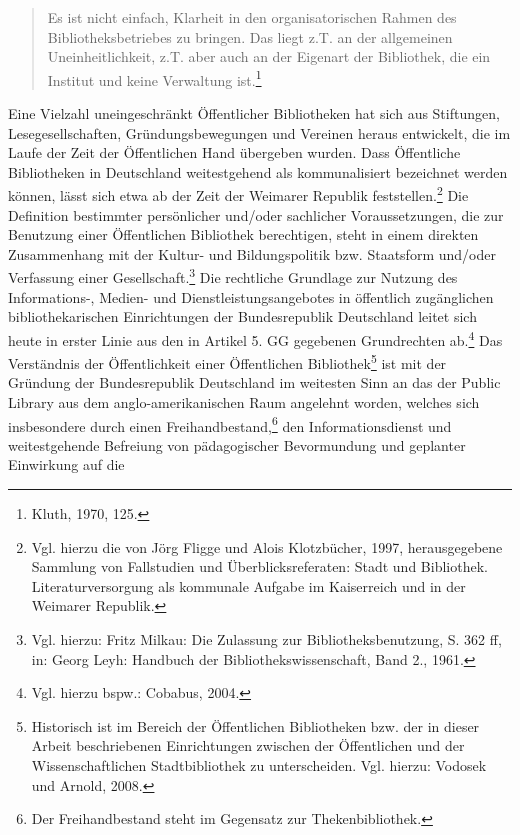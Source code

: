 \documentclass[a4paper,
fontsize=11pt,
oneside,
numbers=noperiodatend,
parskip=half-,
bibliography=totoc,
final
]{scrartcl}
\begin{document}
\begin{quote}
Es ist nicht einfach, Klarheit in den organisatorischen Rahmen des
Bibliotheksbetriebes zu bringen. Das liegt z.T. an der allgemeinen
Uneinheitlichkeit, z.T. aber auch an der Eigenart der Bibliothek, die
ein Institut und keine Verwaltung ist.\footnote{Kluth, 1970, 125.}
\end{quote}

Eine Vielzahl uneingeschränkt Öffentlicher Bibliotheken hat sich aus
Stiftungen, Lesegesellschaften, Gründungsbewegungen und Vereinen heraus
entwickelt, die im Laufe der Zeit der Öffentlichen Hand übergeben
wurden. Dass Öffentliche Bibliotheken in Deutschland weitestgehend als
kommunalisiert bezeichnet werden können, lässt sich etwa ab der Zeit der
Weimarer Republik feststellen.\footnote{Vgl. hierzu die von Jörg Fligge
  und Alois Klotzbücher, 1997, herausgegebene Sammlung von Fallstudien
  und Überblicksreferaten: Stadt und Bibliothek. Literaturversorgung als
  kommunale Aufgabe im Kaiserreich und in der Weimarer Republik.} Die
Definition bestimmter persönlicher und/oder sachlicher Voraussetzungen,
die zur Benutzung einer Öffentlichen Bibliothek berechtigen, steht in
einem direkten Zusammenhang mit der Kultur- und Bildungspolitik bzw.
Staatsform und/oder Verfassung einer Gesellschaft.\footnote{Vgl. hierzu:
  Fritz Milkau: Die Zulassung zur Bibliotheksbenutzung, S. 362 ff, in:
  Georg Leyh: Handbuch der Bibliothekswissenschaft, Band 2., 1961.} Die
rechtliche Grundlage zur Nutzung des Informations-, Medien- und
Dienstleistungsangebotes in öffentlich zugänglichen bibliothekarischen
Einrichtungen der Bundesrepublik Deutschland leitet sich heute in erster
Linie aus den in Artikel 5. GG gegebenen Grundrechten ab.\footnote{Vgl.
  hierzu bspw.: Cobabus, 2004.} Das Verständnis der Öffentlichkeit einer
Öffentlichen Bibliothek\footnote{Historisch ist im Bereich der
  Öffentlichen Bibliotheken bzw. der in dieser Arbeit beschriebenen
  Einrichtungen zwischen der Öffentlichen und der Wissenschaftlichen
  Stadtbibliothek zu unterscheiden. Vgl. hierzu: Vodosek und Arnold,
  2008.} ist mit der Gründung der Bundesrepublik Deutschland im
weitesten Sinn an das der Public Library aus dem anglo-amerikanischen
Raum angelehnt worden, welches sich insbesondere durch einen
Freihandbestand,\footnote{Der Freihandbestand steht im Gegensatz zur
  Thekenbibliothek.} den Informationsdienst und weitestgehende Befreiung
von pädagogischer Bevormundung und geplanter Einwirkung auf die
\end{document}
